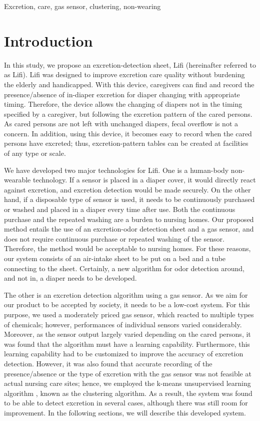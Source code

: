\documentclass[publish,JRM,paper]{jaciiiarticle}
\begin{document}
\begin{keywords}
Excretion, care, gas sensor, clustering, non-wearing
\end{keywords}

\section{Introduction}
In this study, we propose an excretion-detection sheet, Lifi (hereinafter referred to as Lifi). Lifi was designed to improve excretion care quality without burdening the elderly and handicapped. With this device, caregivers can find and record the presence/absence of in-diaper excretion for diaper changing with appropriate timing. Therefore, the device allows the changing of diapers not in the timing specified by a caregiver, but following the excretion pattern of the cared persons. As cared persons are not left with unchanged diapers, fecal overflow is not a concern. In addition, using this device, it becomes easy to record when the cared persons have excreted; thus, excretion-pattern tables can be created at facilities of any type or scale.

We have developed two major technologies for Lifi. One is a human-body non-wearable technology. If a sensor is placed in a diaper cover, it would directly react against excretion, and excretion detection would be made securely. On the other hand, if a disposable type of sensor is used, it needs to be continuously purchased or washed and placed in a diaper every time after use. Both the continuous purchase and the repeated washing are a burden to nursing homes. Our proposed method entails the use of an excretion-odor \cite{itakura} detection sheet and a gas sensor, and does not require continuous purchase or repeated washing of the sensor. Therefore, the method would be acceptable to nursing homes. For these reasons, our system consists of an air-intake sheet to be put on a bed and a tube connecting to the sheet. Certainly, a new algorithm for odor detection around, and not in, a diaper needs to be developed.

The other is an excretion detection algorithm using a gas sensor. As we aim for our product to be accepted by society, it needs to be a low-cost system. For this purpose, we used a moderately priced gas sensor, which reacted to multiple types of chemicals; however, performances of individual sensors varied considerably. Moreover, as the sensor output largely varied depending on the cared persons, it was found that the algorithm must have a learning capability. Furthermore, this learning capability had to be customized to improve the accuracy of excretion detection. However, it was also found that accurate recording of the presence/absence or the type of excretion with the gas sensor was not feasible at actual nursing care sites; hence, we employed the k-means unsupervised learning algorithm \cite{macqueen,okada,act}, known as the clustering algorithm. As a result, the system was found to be able to detect excretion in several cases, although there was still room for improvement. In the following sections, we will describe this developed system.
\end{document}
